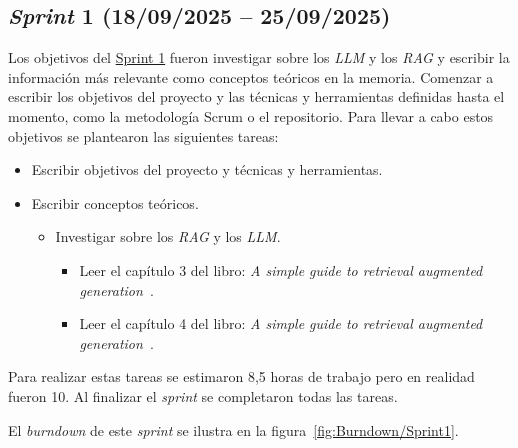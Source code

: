 \subsection{\textit{Sprint} 1 (18/09/2025 -- 25/09/2025)}
Los objetivos del \href{https://github.com/lbr1014/TFG_RAG/milestone/1?closed=1}{Sprint 1} fueron investigar sobre los \textit{LLM} y los \textit{RAG} y escribir la información más relevante como conceptos teóricos en la memoria. Comenzar a escribir los objetivos del proyecto y las técnicas y herramientas definidas hasta el momento, como la metodología Scrum o el repositorio. 
Para llevar a cabo estos objetivos se plantearon las siguientes tareas:
\begin{itemize}
\tightlist
	\item Escribir objetivos del proyecto y técnicas y herramientas.
	\item Escribir conceptos teóricos.
	\begin{itemize}
	\tightlist
		\item Investigar sobre los \textit{RAG} y los \textit{LLM}.
		\begin{itemize}
		\tightlist
			\item Leer el capítulo 3 del libro: \textit{A simple guide to retrieval augmented generation}~\cite{book:RAG_SimpleGuide}.
			\item Leer el capítulo 4 del libro: \textit{A simple guide to retrieval augmented generation}~\cite{book:RAG_SimpleGuide}.
		\end{itemize}
	\end{itemize}
\end{itemize}

Para realizar estas tareas se estimaron 8,5 horas de trabajo pero en realidad fueron 10. Al finalizar el \textit{sprint} se completaron todas las tareas.

El \textit{burndown} de este \textit{sprint} se ilustra en la figura~\ref{fig:Burndown/Sprint1}.

